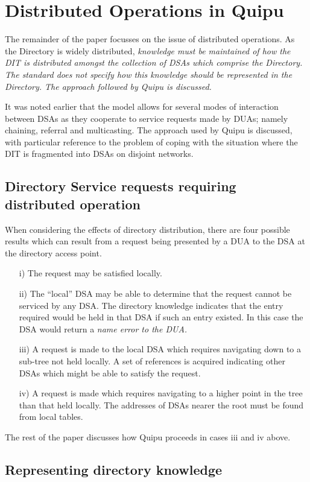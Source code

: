 \section{Distributed Operations in Quipu}

The remainder of the paper focusses on the issue of distributed operations.
As the Directory is widely distributed, 
\it
knowledge
\rm
must be maintained of how the DIT is distributed amongst the collection of
DSAs which comprise the Directory.  The standard does not specify how this
knowledge should be represented in the Directory.
The approach followed by Quipu is discussed.

It was noted earlier that the model allows for several modes of interaction
between DSAs as they cooperate to service requests made by DUAs; namely
chaining, referral and multicasting.  The approach used by Quipu is discussed,
with particular reference to the problem of coping with the situation where
the DIT is fragmented into DSAs on disjoint networks.
\subsection{Directory Service requests requiring distributed operation}

When considering the effects of directory distribution, there are four
possible results which can result from a request being presented by a DUA to
the DSA at the directory access point.
\begin{itemize}
\item[{i)}]
The request may be satisfied locally.
\item[{ii)}]
The ``local'' DSA may be able to determine that the request cannot be serviced
by any DSA. The directory knowledge indicates that the entry required would
be held in that DSA if such an entry existed.  In this case the DSA would
return a
\it
name error
\rm
to the DUA.
\item[{iii)}]
A request is made to the local DSA which requires navigating down to 
a sub-tree not
held locally.  A set of references is acquired
indicating other DSAs which might be able to
satisfy the request.
\item[{iv)}]
A request is made which requires navigating to a higher point in the tree 
than that held locally.  The addresses of DSAs nearer the root must be found
from local tables.
\end{itemize}
The rest of the paper discusses how Quipu proceeds in cases iii and iv above.
\subsection{Representing directory knowledge}

